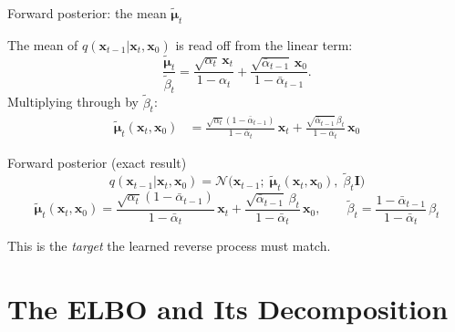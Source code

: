 \documentclass[aspectratio=169,11pt]{beamer}
\newcommand{\Norm}{\mathcal{N}}
\newcommand{\bx}{\bm{x}}
\newcommand{\bmu}{\bm{\mu}}
\begin{document}
\begin{frame}{Forward posterior: the mean $\tilde{\bmu}_t$}

The mean of $q(\bx_{t-1}|\bx_t,\bx_0)$ is read off from the linear term:
\[
  \frac{\tilde{\bmu}_t}{\tilde\beta_t}
  = \frac{\sqrt{\alpha_t}\,\bx_t}{1-\alpha_t}
  + \frac{\sqrt{\bar\alpha_{t-1}}\,\bx_0}{1-\bar\alpha_{t-1}}.
\]
Multiplying through by $\tilde\beta_t$:
\begin{align*}
\tilde{\bmu}_t(\bx_t,\bx_0)
&= \frac{\sqrt{\alpha_t}(1-\bar\alpha_{t-1})}{1-\bar\alpha_t}\,\bx_t
 + \frac{\sqrt{\bar\alpha_{t-1}}\,\beta_t}{1-\bar\alpha_t}\,\bx_0
\end{align*}

\begin{block}{Forward posterior (exact result)}
\[
\boxed{
q(\bx_{t-1}|\bx_t,\bx_0)
= \Norm\!\bigl(\bx_{t-1};\;\tilde{\bmu}_t(\bx_t,\bx_0),\;\tilde\beta_t\mathbf{I}\bigr)
}
\]
\vspace{-2mm}
\[
\tilde{\bmu}_t(\bx_t,\bx_0)
= \frac{\sqrt{\alpha_t}(1-\bar\alpha_{t-1})}{1-\bar\alpha_t}\,\bx_t
+ \frac{\sqrt{\bar\alpha_{t-1}}\,\beta_t}{1-\bar\alpha_t}\,\bx_0,
\qquad
\tilde\beta_t = \frac{1-\bar\alpha_{t-1}}{1-\bar\alpha_t}\,\beta_t
\]
\end{block}

This is the \emph{target} the learned reverse process must match.
\end{frame}

\section{The ELBO and Its Decomposition}
\end{document}
